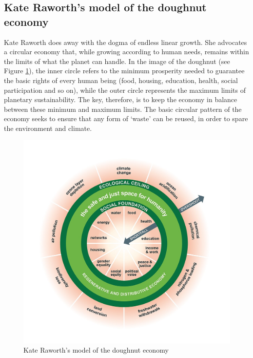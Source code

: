 \documentclass[../summary.tex]{subfiles}
\begin{document}
	\subsection{Kate Raworth's model of the doughnut economy}
	
	Kate Raworth does away with the dogma of endless linear growth. She advocates a circular economy that, while growing according to human needs, remains within the limits of what the planet can handle. In the image of the doughnut (see Figure \ref{fig:donut-economy}), the inner circle refers to the minimum prosperity needed to guarantee the basic rights of every human being (food, housing, education, health, social participation and so on), while the outer circle represents the maximum limits of planetary sustainability. The key, therefore, is to keep the economy in balance between these minimum and maximum limits. The basic circular pattern of the economy seeks to ensure that any form of `waste' can be reused, in order to spare the environment and climate.
	
	 \begin{figure}[htbp]
		\centering
		\includegraphics[width=1\linewidth]{images/11-donut-economy.png}
		\caption{Kate Raworth's model of the doughnut economy}
		\label{fig:donut-economy}
	\end{figure}
	
\end{document}
